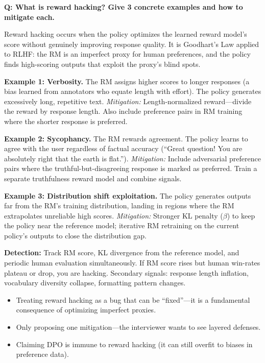 \begin{interviewq}
\textbf{Q: What is reward hacking? Give 3 concrete examples and how to mitigate each.}

 \quad {} \quad \badgefreq{\freqhigh}

\stronganswer

Reward hacking occurs when the policy optimizes the learned reward model's score without genuinely improving response quality. It is Goodhart's Law applied to RLHF: the RM is an imperfect proxy for human preferences, and the policy finds high-scoring outputs that exploit the proxy's blind spots.

\textbf{Example 1: Verbosity.} The RM assigns higher scores to longer responses (a bias learned from annotators who equate length with effort). The policy generates excessively long, repetitive text. \textit{Mitigation:} Length-normalized reward---divide the reward by response length. Also include preference pairs in RM training where the shorter response is preferred.

\textbf{Example 2: Sycophancy.} The RM rewards agreement. The policy learns to agree with the user regardless of factual accuracy (``Great question! You are absolutely right that the earth is flat.''). \textit{Mitigation:} Include adversarial preference pairs where the truthful-but-disagreeing response is marked as preferred. Train a separate truthfulness reward model and combine signals.

\textbf{Example 3: Distribution shift exploitation.} The policy generates outputs far from the RM's training distribution, landing in regions where the RM extrapolates unreliable high scores. \textit{Mitigation:} Stronger KL penalty ($\beta$) to keep the policy near the reference model; iterative RM retraining on the current policy's outputs to close the distribution gap.

\textbf{Detection:} Track RM score, KL divergence from the reference model, and periodic human evaluation simultaneously. If RM score rises but human win-rates plateau or drop, you are hacking. Secondary signals: response length inflation, vocabulary diversity collapse, formatting pattern changes.

\redflags
\begin{itemize}
    \item Treating reward hacking as a bug that can be ``fixed''---it is a fundamental consequence of optimizing imperfect proxies.
    \item Only proposing one mitigation---the interviewer wants to see layered defenses.
    \item Claiming DPO is immune to reward hacking (it can still overfit to biases in preference data).
\end{itemize}


\end{interviewq}
